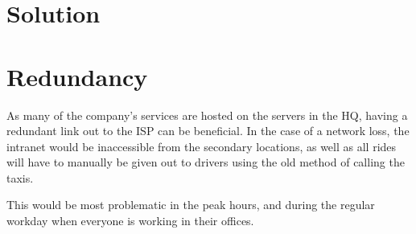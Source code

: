 \section{Solution}



\section{Redundancy}
As many of the company's services are hosted on the servers in the HQ, having a redundant link out to the ISP can be beneficial.
In the case of a network loss, the intranet would be inaccessible from the secondary locations, as well as all rides will have to manually be given out to drivers using the old method of calling the taxis.

This would be most problematic in the peak hours, and during the regular workday when everyone is working in their offices.
